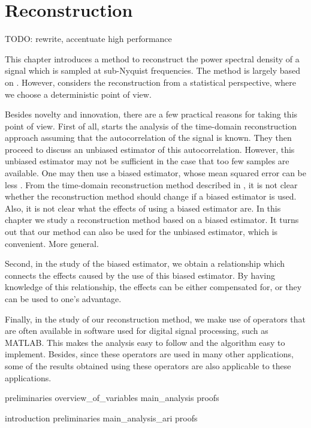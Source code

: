 \documentclass[a4paper, openany, oneside]{memoir}
\begin{document}
\chapter{Reconstruction}
TODO: rewrite, accentuate high performance

This chapter introduces a method to reconstruct the power spectral density of a signal which is sampled at sub-Nyquist frequencies. The method is largely based on \cite{ariananda2012compressive}. However, \cite{ariananda2012compressive} considers the reconstruction from a statistical perspective, where we choose a deterministic point of view.

Besides novelty and innovation, there are a few practical reasons for taking this point of view. First of all, \cite{ariananda2012compressive} starts the analysis of the time-domain reconstruction approach assuming that the autocorrelation of the signal is known. They then proceed to discuss an unbiased estimator of this autocorrelation. However, this unbiased estimator may not be sufficient in the case that too few samples are available. One may then use a biased estimator, whose mean squared error can be less \cite{percival1993univariate}. From the time-domain reconstruction method described in \cite{ariananda2012compressive}, it is not clear whether the reconstruction method should change if a biased estimator is used. Also, it is not clear what the effects of using a biased estimator are. In this chapter we study a reconstruction method based on a biased estimator. It turns out that our method can also be used for the unbiased estimator, which is convenient. More general.

Second, in the study of the biased estimator, we obtain a relationship which connects the effects caused by the use of this biased estimator. By having knowledge of this relationship, the effects can be either compensated for, or they can be used to one's advantage.

Finally, in the study of our reconstruction method, we make use of operators that are often available in software used for digital signal processing, such as MATLAB. This makes the analysis easy to follow and the algorithm easy to implement. Besides, since these operators are used in many other applications, some of the results obtained using these operators are also applicable to these applications. 

{preliminaries}
{overview_of_variables}
{main_analysis}
{proofs}


{introduction}
{preliminaries}
{main_analysis_ari}
{proofs}
\end{document}
